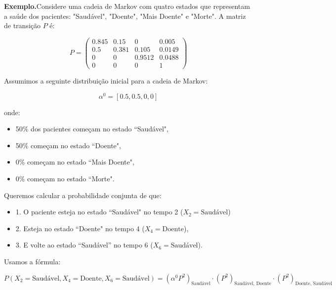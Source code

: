\documentclass[12pt, a4paper, openany]{book}
\numberwithin{equation}{chapter}
\numberwithin{table}{chapter}
\numberwithin{figure}{chapter}
\theoremstyle{break}
\begin{document}
\textbf{Exemplo.}Considere uma cadeia de Markov com quatro estados que representam a saúde dos pacientes: "Saudável", "Doente", "Mais Doente" e "Morte". A matriz de transição \( P \) é:

\[
P = \begin{pmatrix}
0.845 & 0.15 & 0 & 0.005 \\
0.5 & 0.381 & 0.105 & 0.0149 \\
0 & 0 & 0.9512 & 0.0488 \\
0 & 0 & 0 & 1
\end{pmatrix}
\]

Assumimos a seguinte distribuição inicial para a cadeia de Markov:

\[
\alpha^0 = [0.5, 0.5, 0, 0]
\]

onde:

\begin{itemize}
    \item 50\% dos pacientes começam no estado ``Saudável",

    \item 50\% começam no estado ``Doente",

    \item 0\% começam no estado ``Mais Doente",

    \item 0\% começam no estado ``Morte".
\end{itemize}


Queremos calcular a probabilidade conjunta de que:

\begin{itemize}
    \item 1. O paciente esteja no estado ``Saudável" no tempo 2 (\( X_2 = \text{Saudável} \))

    \item 2. Esteja no estado ``Doente" no tempo 4 (\( X_4 = \text{Doente} \)),

    \item 3. E volte ao estado ``Saudável'' no tempo 6 (\( X_6 = \text{Saudável} \)).
\end{itemize}


Usamos a fórmula:

\[
P(X_2 = \text{Saudável}, X_4 = \text{Doente}, X_6 = \text{Saudável}) = (\alpha^0 P^2)_{\text{Saudável}} \cdot (P^2)_{\text{Saudável, Doente}} \cdot (P^2)_{\text{Doente, Saudável}}
\]
\end{document}
